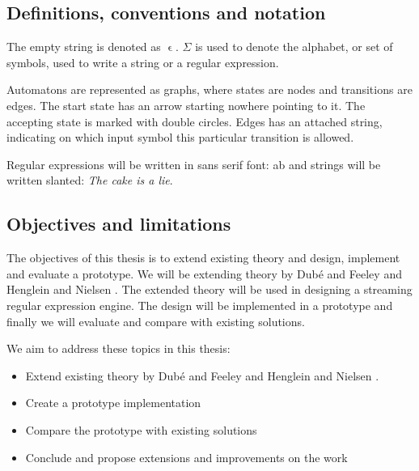 



\subsection{Definitions, conventions and notation}

The empty string is denoted as $\upvarepsilon$. $\Sigma$ is used to
denote the alphabet, or set of symbols, used to write a string or a
regular expression. 

Automatons are represented as graphs, where states are nodes and
transitions are edges. The start state has an arrow starting nowhere
pointing to it. The accepting state is marked with double
circles. Edges has an attached string, indicating on which input
symbol this particular transition is allowed.

Regular expressions will be written in sans serif font:
\textsf{a\textbar b} and strings will be written slanted: \textsl{The
  cake is a lie}.


\subsection{Objectives and limitations}

The objectives of this thesis is to extend existing theory and design,
implement and evaluate a prototype. We will be extending theory by
Dub\'{e} and Feeley \cite{Dube2000} and Henglein and Nielsen
\cite{Henglein2010}. The extended theory will be used in designing a
streaming regular expression engine. The design will be implemented in
a prototype and finally we will evaluate and compare with existing
solutions.

We aim to address these topics in this thesis:

\begin{itemize}
\item Extend existing theory by Dub\'{e} and Feeley \cite{Dube2000}
  and Henglein and Nielsen \cite{Henglein2010}.

\item Create a prototype implementation

\item Compare the prototype with existing solutions 

\item Conclude and propose extensions and improvements on the work
\end{itemize}

